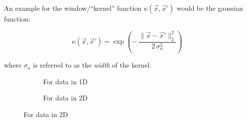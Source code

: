 \begin{frame}

An example for the window/``kernel'' function $\kappa(\vec x, \vec x')$ would be the gaussian function:

\begin{equation}
\kappa(\vec x, \vec x') = \exp\left( -\,\frac{\lVert \vec x - \vec x'\rVert^2_2}{2\,\sigma_{\kappa}^2} \right)
\label{eq:gauss_kernel}
\end{equation}

where $\sigma_{\kappa}$ is referred to as the \emph{width} of the kernel.

\begin{figure}[ht]
     \centering
     \begin{subfigure}[t]{0.37\textwidth}
         \centering
         \usebox{\imagebox}%
         \caption{For data in 1D}
         \label{fig:quadratic}
     \end{subfigure}
     \hspace{2mm}
     \begin{subfigure}[t]{0.37\textwidth}
         \centering
         \caption{For data in 2D}
         \label{fig:linear}
     \end{subfigure}
	 \label{fig:quadratic_density_gaussian}
\end{figure}

\end{frame}

